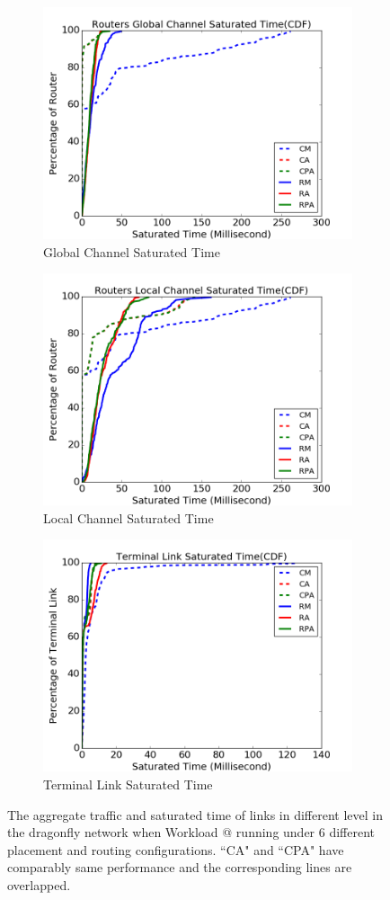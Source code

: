 \documentclass[conference,compsoc]{IEEEtran}
\makeatletter
\newcommand{\Rmnum}[1]{\expandafter\@slowromancap\romannumeral #1@}
\makeatother
\begin{document}
\begin{figure}[t!]
    \centering   
    \begin{subfigure}[t]{0.32\textwidth}
        \centering
        \includegraphics[height=1.8 in]{wkld/gc-stime}
        \caption{Global Channel Saturated Time}
        \label{fig:global-channel-stime}
    \end{subfigure}\hfill
     \hspace{1em}%
    \begin{subfigure}[t]{0.32\textwidth}
        \centering
        \includegraphics[height=1.8 in]{wkld/lc-stime}
        \caption{Local Channel Saturated Time}
        \label{fig:local-channel-stime}
    \end{subfigure}\hfill
    \hspace{1em}%
    \begin{subfigure}[t]{0.32\textwidth}
        \centering
        \includegraphics[height=1.8 in]{wkld/tl-stime}
        \caption{Terminal Link Saturated Time}
        \label{fig:terminal-link-stime}
    \end{subfigure}%
   \caption{The aggregate traffic and saturated time of links in different level in the dragonfly network when Workload \Rmnum{1} running under 6 different placement and routing configurations. ``CA" and ``CPA" have comparably same performance and the corresponding lines are overlapped. }
   \label{fig:wkld-network-traffic-stime}
\end{figure}
\end{document}
